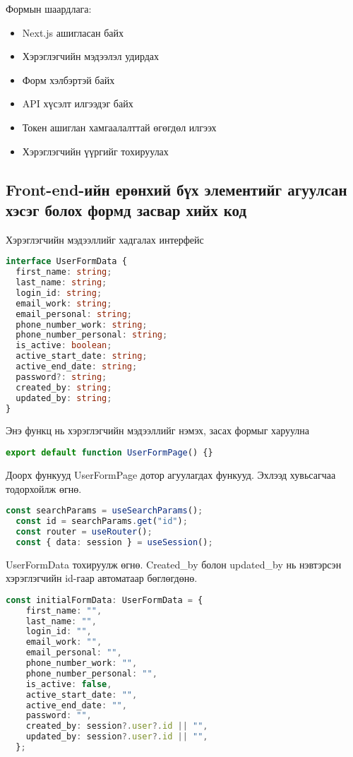 Формын шаардлага:
\begin{itemize}
	\item Next.js ашигласан байх
	\item Хэрэглэгчийн мэдээлэл удирдах
	\item Форм хэлбэртэй байх
	\item API хүсэлт илгээдэг байх
	\item Токен ашиглан хамгаалалттай өгөгдөл илгээх
	\item Хэрэглэгчийн үүргийг тохируулах
\end{itemize}
\pagebreak

\subsection{Front-end-ийн ерөнхий бүх элементийг агуулсан хэсэг болох формд засвар хийх код}

Хэрэглэгчийн мэдээллийг хадгалах интерфейс

\begin{lstlisting}[language=Typescript, caption=UserFormData интерфейсийг үүсгэсэн байдал, frame=single]
interface UserFormData {
  first_name: string;
  last_name: string;
  login_id: string;
  email_work: string;
  email_personal: string;
  phone_number_work: string;
  phone_number_personal: string;
  is_active: boolean;
  active_start_date: string;
  active_end_date: string;
  password?: string;
  created_by: string;
  updated_by: string;
}
\end{lstlisting}

Энэ функц нь хэрэглэгчийн мэдээллийг нэмэх, засах формыг харуулна
\begin{lstlisting}[language=Typescript, caption=UserFormPage функц (Main component), frame=single]
export default function UserFormPage() {}
\end{lstlisting}

Доорх функууд UserFormPage дотор агуулагдах функууд. Эхлээд хувьсагчаа тодорхойлж өгнө.
\begin{lstlisting}[language=Typescript, caption=Хувьсагч, frame=single]
	const searchParams = useSearchParams();
  const id = searchParams.get("id");
  const router = useRouter();
  const { data: session } = useSession();
\end{lstlisting}

UserFormData тохируулж өгнө. Created_by болон updated_by нь нэвтэрсэн хэрэглэгчийн id-гаар автоматаар бөглөгдөнө.

\begin{lstlisting}[language=Typescript, caption=initialFormData хоосон утга оноосон байдал, frame=single]
	const initialFormData: UserFormData = {
    first_name: "",
    last_name: "",
    login_id: "",
    email_work: "",
    email_personal: "",
    phone_number_work: "",
    phone_number_personal: "",
    is_active: false,
    active_start_date: "",
    active_end_date: "",
    password: "",
    created_by: session?.user?.id || "",
    updated_by: session?.user?.id || "",
  };
\end{lstlisting}

